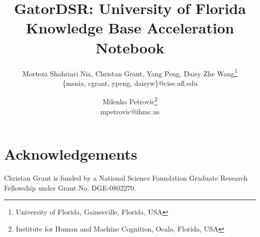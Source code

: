 \documentclass[10pt]{article}
\begin{document}
\title{GatorDSR: University of Florida Knowledge Base Acceleration Notebook}





\author {
 Morteza Shahriari Nia, Christan Grant, Yang Peng, Daisy Zhe Wang\footnote{ University of Florida, Gainesville, Florida, USA}\\
       { \{msnia, cgrant, ypeng, daisyw\}@cise.ufl.edu}
\and
  Milenko Petrovic\footnote{Institute for Human and Machine Cognition, Ocala, Florida, USA}\\
       {mpetrovic@ihmc.us}
}

\maketitle
















\section*{Acknowledgements}
Christan Grant is funded by a National Science Foundation Graduate Research
Fellowship under Grant No. DGE-0802270. 

%
%



\end{document}
